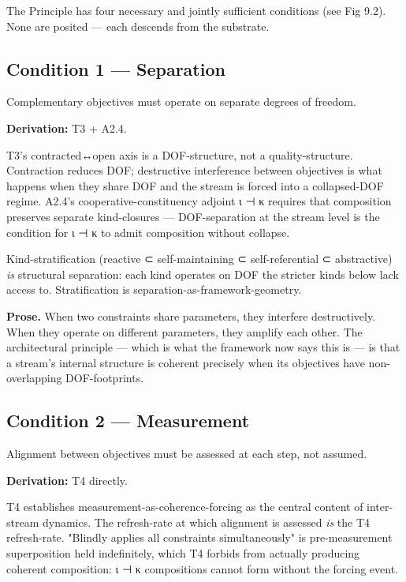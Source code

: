 \documentclass[11pt, openany]{book}
\renewenvironment{quote}{\begin{quoting}}{\end{quoting}}
\begin{document}
The Principle has four necessary and jointly sufficient conditions (see Fig 9.2). None are posited --- each descends from the substrate.

\subsection{Condition 1 --- Separation}

\begin{quote}
Complementary objectives must operate on separate degrees of freedom.
\end{quote}

\textbf{Derivation:} T3 + A2.4.

T3's contracted↔open axis is a DOF-structure, not a quality-structure. Contraction reduces DOF; destructive interference between objectives is what happens when they share DOF and the stream is forced into a collapsed-DOF regime. A2.4's cooperative-constituency adjoint ι ⊣ κ requires that composition preserves separate kind-closures --- DOF-separation at the stream level is the condition for ι ⊣ κ to admit composition without collapse.

Kind-stratification (reactive ⊂ self-maintaining ⊂ self-referential ⊂ abstractive) \textit{is} structural separation: each kind operates on DOF the stricter kinds below lack access to. Stratification is separation-as-framework-geometry.

\textbf{Prose.} When two constraints share parameters, they interfere destructively. When they operate on different parameters, they amplify each other. The architectural principle --- which is what the framework now says this is --- is that a stream's internal structure is coherent precisely when its objectives have non-overlapping DOF-footprints.

\subsection{Condition 2 --- Measurement}

\begin{quote}
Alignment between objectives must be assessed at each step, not assumed.
\end{quote}

\textbf{Derivation:} T4 directly.

T4 establishes measurement-as-coherence-forcing as the central content of inter-stream dynamics. The refresh-rate at which alignment is assessed \textit{is} the T4 refresh-rate. "Blindly applies all constraints simultaneously" is pre-measurement superposition held indefinitely, which T4 forbids from actually producing coherent composition: ι ⊣ κ compositions cannot form without the forcing event.
\end{document}
